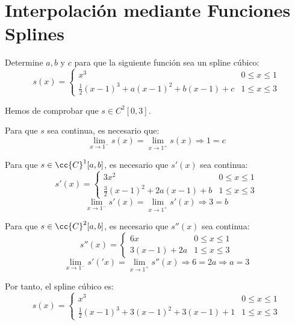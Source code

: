 \section{Interpolación mediante Funciones Splines}

\begin{ejercicio} Determine $a, b$ y $c$ para que la siguiente función sea un spline cúbico:
\begin{equation*}
    s(x)=\left\{\begin{array}{lc}
        x^3 & 0\leq x \leq 1 \\
        \frac{1}{2}(x-1)^3 +a(x-1)^2 + b(x-1) + c& 1\leq x \leq 3 
    \end{array}\right.
\end{equation*}

Hemos de comprobar que $s\in {C}^{2}[0,3]$.

Para que $s$ sea continua, es necesario que:
\begin{equation*}
    \lim_{x\to1^-}s(x) = \lim_{x\to1^+}s(x) \Longrightarrow 1 = c
\end{equation*}

Para que $s\in \cc{C}^1[a,b]$, es necesario que $s'(x)$ sea continua:
\begin{equation*}
    s'(x)=\left\{\begin{array}{lc}
        3x^2 & 0\leq x \leq 1 \\
        \frac{3}{2}(x-1)^2 +2a(x-1) + b& 1\leq x \leq 3 
    \end{array}\right.
\end{equation*}
\begin{equation*}
    \lim_{x\to1^-}s'(x) = \lim_{x\to1^+}s'(x) \Longrightarrow 3 = b
\end{equation*}

Para que $s\in \cc{C}^2[a,b]$, es necesario que $s''(x)$ sea continua:
\begin{equation*}
    s''(x)=\left\{\begin{array}{lc}
        6x & 0\leq x \leq 1 \\
        3(x-1) +2a& 1\leq x \leq 3 
    \end{array}\right.
\end{equation*}
\begin{equation*}
    \lim_{x\to1^-}s'('x) = \lim_{x\to1^+}s''(x) \Longrightarrow 6=2a \Longrightarrow a=3
\end{equation*}

Por tanto, el spline cúbico es:
\begin{equation*}
    s(x)=\left\{\begin{array}{lc}
        x^3 & 0\leq x \leq 1 \\
        \frac{1}{2}(x-1)^3 +3(x-1)^2 + 3(x-1) + 1& 1\leq x \leq 3 
    \end{array}\right.
\end{equation*}

\end{ejercicio}

